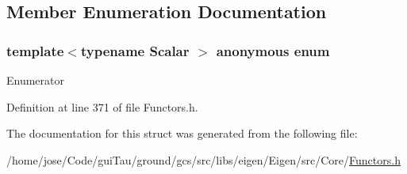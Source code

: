 \subsection{Member Enumeration Documentation}
\hypertarget{structei__functor__has__linear__access_3_01ei__scalar__identity__op_3_01_scalar_01_4_01_4_a640adf8d82fb2690dcbd09a5f3a19ab6}{\subsubsection[{anonymous enum}]{\setlength{\rightskip}{0pt plus 5cm}template$<$typename Scalar $>$ anonymous enum}}\label{structei__functor__has__linear__access_3_01ei__scalar__identity__op_3_01_scalar_01_4_01_4_a640adf8d82fb2690dcbd09a5f3a19ab6}
\begin{Desc}
\item[Enumerator]\par
\begin{description}
\item[{\em 
\hypertarget{structei__functor__has__linear__access_3_01ei__scalar__identity__op_3_01_scalar_01_4_01_4_a640adf8d82fb2690dcbd09a5f3a19ab6a85b03ff8529f31082d87d5112b7dda86}{ret}\label{structei__functor__has__linear__access_3_01ei__scalar__identity__op_3_01_scalar_01_4_01_4_a640adf8d82fb2690dcbd09a5f3a19ab6a85b03ff8529f31082d87d5112b7dda86}
}]\end{description}
\end{Desc}


Definition at line 371 of file Functors.\-h.



The documentation for this struct was generated from the following file\-:\begin{DoxyCompactItemize}
\item 
/home/jose/\-Code/gui\-Tau/ground/gcs/src/libs/eigen/\-Eigen/src/\-Core/\hyperlink{_core_2_functors_8h}{Functors.\-h}\end{DoxyCompactItemize}
